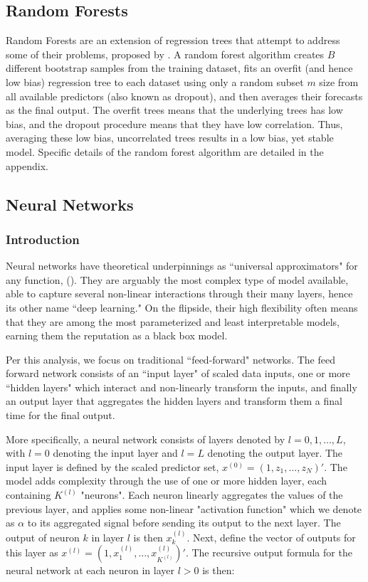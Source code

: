 \documentclass[a4paper, table]{article}
\begin{document}
\subsection{Random Forests}
Random Forests are an extension of regression trees that attempt to address some of their problems, proposed by \cite{breiman_random_2001}. A random forest algorithm creates $B$ different bootstrap samples from the training dataset, fits an overfit (and hence low bias) regression tree to each dataset using only a random subset $m$ size from all available predictors (also known as dropout), and then averages their forecasts as the final output. The overfit trees means that the underlying trees has low bias, and the dropout procedure means that they have low correlation. Thus, averaging these low bias, uncorrelated trees results in a low bias, yet stable model. Specific details of the random forest algorithm are detailed in the appendix.

\newpage

\subsection{Neural Networks}

\subsubsection{Introduction}

Neural networks have theoretical underpinnings as ``universal approximators" for any function, (\cite{hornik_multilayer_1989}). They are arguably the most complex type of model available, able to capture several non-linear interactions through their many layers, hence its other name ``deep learning."  On the flipside, their high flexibility often means that they are among the most parameterized and least interpretable models, earning them the reputation as a black box model.

Per this analysis, we focus on traditional ``feed-forward" networks. The feed forward network consists of an ``input layer" of scaled data inputs, one or more ``hidden layers" which interact and non-linearly transform the inputs, and finally an output layer that aggregates the hidden layers and transform them a final time for the final output. 

More specifically, a neural network consists of layers denoted by $l = 0, 1, \dots, L$, with $l = 0$ denoting the input layer and $l = L$ denoting the output layer. The input layer is defined by the scaled predictor set, $x^{(0)} = (1, z_1, \dots, z_N)'$. The model adds complexity through the use of one or more hidden layer, each containing $K^{(l)}$ "neurons". Each neuron linearly aggregates the values of the previous layer, and applies some non-linear "activation function" which we denote as $\alpha$ to its aggregated signal before sending its output to the next layer. The output of neuron $k$ in layer $l$ is then $x_k^{(l)}$. Next, define the vector of outputs for this layer as $x^{(l)} = (1, x_1^{(l)}, \dots, x_{K^(l)}^{(l)})'$.  The recursive output formula for the neural network at each neuron in layer $l > 0$ is then:
\end{document}
